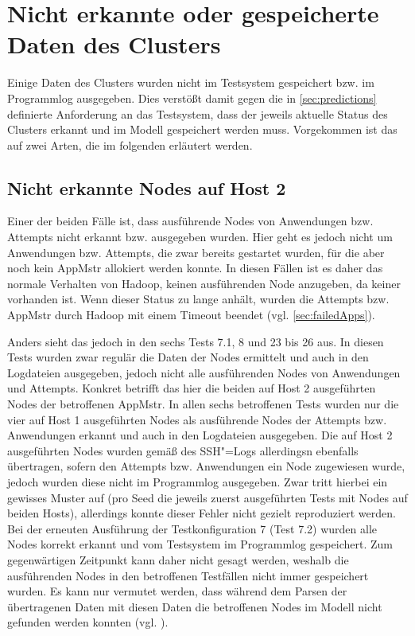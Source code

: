 \section{Nicht erkannte oder gespeicherte Daten des Clusters}
\label{sec:notDetectedData}

Einige Daten des Clusters wurden nicht im Testsystem gespeichert bzw. im Programmlog ausgegeben.
Dies verstößt damit gegen die in \autoref{sec:predictions} definierte Anforderung an das Testsystem, dass der jeweils aktuelle Status des Clusters erkannt und im Modell gespeichert werden muss.
Vorgekommen ist das auf zwei Arten, die im folgenden erläutert werden.

\subsection{Nicht erkannte Nodes auf Host 2}
\label{sec:notDetectedHost2}

Einer der beiden Fälle ist, dass ausführende Nodes von Anwendungen bzw. Attempts nicht erkannt bzw. ausgegeben wurden.
Hier geht es jedoch nicht um Anwendungen bzw. Attempts, die zwar bereits gestartet wurden, für die aber noch kein \ac{AppMstr} allokiert werden konnte.
In diesen Fällen ist es daher das normale Verhalten von Hadoop, keinen ausführenden Node anzugeben, da keiner vorhanden ist.
Wenn dieser Status zu lange anhält, wurden die Attempts bzw. \ac{AppMstr} durch Hadoop mit einem Timeout beendet (vgl. \autoref{sec:failedApps}).

Anders sieht das jedoch in den sechs Tests 7.1, 8 und 23 bis 26 aus.
In diesen Tests wurden zwar regulär die Daten der Nodes ermittelt und auch in den Logdateien ausgegeben, jedoch nicht alle ausführenden Nodes von Anwendungen und Attempts.
Konkret betrifft das hier die beiden auf Host 2 ausgeführten Nodes der betroffenen \ac{AppMstr}.
In allen sechs betroffenen Tests wurden nur die vier auf Host 1 ausgeführten Nodes als ausführende Nodes der Attempts bzw. Anwendungen erkannt und auch in den Logdateien ausgegeben.
Die auf Host 2 ausgeführten Nodes wurden gemäß des SSH"=Logs allerdingsn ebenfalls übertragen, sofern den Attempts bzw. Anwendungen ein Node zugewiesen wurde, jedoch wurden diese nicht im Programmlog ausgegeben.
Zwar tritt hierbei ein gewisses Muster auf (pro Seed die jeweils zuerst ausgeführten Tests mit Nodes auf beiden Hosts), allerdings konnte dieser Fehler nicht gezielt reproduziert werden.
Bei der erneuten Ausführung der Testkonfiguration 7 (Test 7.2) wurden alle Nodes korrekt erkannt und vom Testsystem im Programmlog gespeichert.
Zum gegenwärtigen Zeitpunkt kann daher nicht gesagt werden, weshalb die ausführenden Nodes in den betroffenen Testfällen nicht immer gespeichert wurden.
Es kann nur vermutet werden, dass während dem Parsen der übertragenen Daten mit diesen Daten die betroffenen Nodes im Modell nicht gefunden werden konnten (vgl. ).

